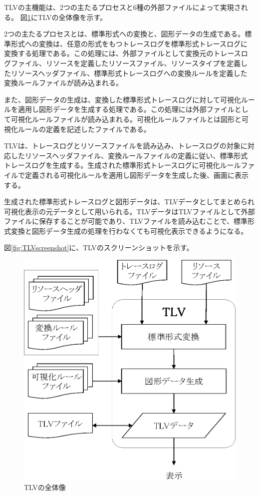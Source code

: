 TLVの主機能は、2つの主たるプロセスと6種の外部ファイルによって実現される。
図\ref{fig:tlv}にTLVの全体像を示す。

2つの主たるプロセスとは、標準形式への変換と、図形データの生成である。標
準形式への変換は、任意の形式をもつトレースログを標準形式トレースログに
変換する処理である。この処理には、外部ファイルとして変換元のトレースロ
グファイル、リソースを定義したリソースファイル、リソースタイプを定義し
たリソースヘッダファイル、標準形式トレースログへの変換ルールを定義した
変換ルールファイルが読み込まれる。

また、図形データの生成は、変換した標準形式トレースログに対して可視化ルー
ルを適用し図形データを生成する処理である。この処理には外部ファイルとし
て可視化ルールファイルが読み込まれる。可視化ルールファイルとは図形と可
視化ルールの定義を記述したファイルである。

TLVは、トレースログとリソースファイルを読み込み、トレースログの対象に対
応したリソースヘッダファイル、変換ルールファイルの定義に従い、標準形式
トレースログを生成する。生成された標準形式トレースログに可視化ルールファ
イルで定義される可視化ルールを適用し図形データを生成した後、画面に表示
する。

生成された標準形式トレースログと図形データは、TLVデータとしてまとめられ
可視化表示の元データとして用いられる。TLVデータはTLVファイルとして外部
ファイルに保存することが可能であり、TLVファイルを読み込むことで、標準形
式変換と図形データ生成の処理を行わなくても可視化表示できるようになる。

図\ref{fig:TLVscreenshot}に、TLVのスクリーンショットを示す。

\begin{figure}[!t]
\begin{center}
\includegraphics[scale=0.7]{tlv.eps}
\caption{TLVの全体像}
\label{fig:tlv}
\end{center}
\end{figure}

